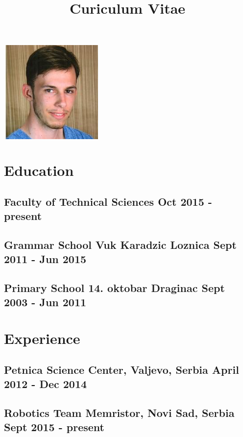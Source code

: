 \documentclass{article}
\title{Curiculum Vitae}
\begin{document}
\maketitle

\includegraphics[width=2in]{../img/me.jpg}

\section{Education}

\subsection{Faculty of Technical Sciences \hfill 
Oct 2015 - present}

\subsection{Grammar School Vuk Karadzic Loznica \hfill 
Sept 2011 - Jun 2015}

\subsection{Primary School 14. oktobar Draginac \hfill 
Sept 2003 - Jun 2011}


\section{Experience}

\subsection{Petnica Science Center, Valjevo, Serbia \hfill 
April 2012 - Dec 2014}

\subsection{Robotics Team Memristor, Novi Sad, Serbia \hfill 
Sept 2015 - present}
\end{document}
